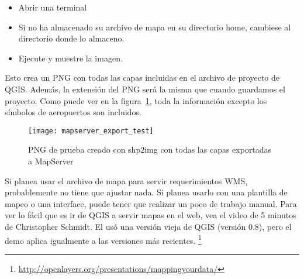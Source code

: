 \begin{itemize}
\item Abrir una terminal
\item Si no ha almacenado su archivo de mapa en su directorio home, cambiese al
  directorio donde lo almaceno.
\item Ejecute  y 
  muestre la imagen. 
\end{itemize}
 
Esto crea un PNG con todas las capas incluidas en el archivo de proyecto de QGIS. 
Además, la extensión del PNG será la misma que cuando guardamos el proyecto.
Como puede ver en la figura~\ref{fig:mapserver_export_test}, toda la  
información excepto los símbolos de aeropuertos son incluidos.

\begin{figure}[ht]
\begin{center}
  \caption{PNG de prueba creado con shp2img con todas las capas exportadas a MapServer \nixcaption}
  \label{fig:mapserver_export_test}\smallskip
  \texttt{[image: mapserver\_export\_test]}
\end{center}
\end{figure}

Si planea usar el archivo de mapa para servir requerimientos WMS, probablemente no
tiene que ajustar nada. Si planea usarlo con una plantilla de mapeo o una
interface, puede tener que realizar un poco de trabajo manual. Para ver lo fácil
que es ir de QGIS a servir mapas en el web, vea el video de
5 minutos de Christopher Schmidt. El usó una versión vieja de QGIS (versión 0.8), pero el demo aplica
igualmente a las versiones más recientes.
\footnote{\url{http://openlayers.org/presentations/mappingyourdata/}}
